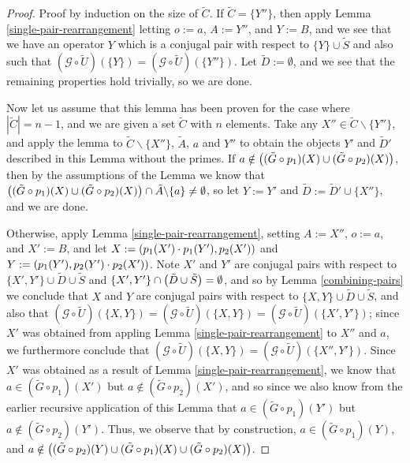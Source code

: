 \documentclass[twocolumn,showpacs,preprintnumbers,amsmath,amssymb,nofootinbib,pra,floatfix]{revtex4-1}
\newcommand{\set}{\tilde}
\newcommand{\genfun}{\mathcal{G}}
\begin{document}
\begin{proof}
Proof by induction on the size of $\set C$.  If $\set C=\{Y''\}$, then apply Lemma \ref{single-pair-rearrangement} letting $o:=a$, $A:=Y''$, and $Y:=B$, and we see that we have an operator $Y$ which is a conjugal pair with respect to $\{Y\}\cup\set S$ and also such that $(\genfun\circ\set U)(\{Y\})=(\genfun\circ\set U)(\{Y''\})$.  Let $\set D:=\emptyset$, and we see that the remaining properties hold trivially, so we are done.

Now let us assume that this lemma has been proven for the case where $|\set C|=n-1$, and we are given a set $\set C$ with $n$ elements.  Take any $X''\in\set C\backslash\{Y''\}$, and apply the lemma to $\set C\backslash \{X''\}$, $\set A$, $a$ and $Y''$ to obtain the objects $Y'$ and $\set D'$ described in this Lemma without the primes.  If $a\notin\paren{(\set G\circ p_1)(X) \cup (\set G\circ p_2)(X)}$, then by the assumptions of the Lemma we know that $\paren{(\set G\circ p_1)(X) \cup (\set G\circ p_2)(X)} \cap \set A\backslash \{a\} \ne \emptyset$, so let $Y:=Y'$ and $\set D:=\set D'\cup\{X''\}$, and we are done.

Otherwise, apply Lemma \ref{single-pair-rearrangement}, setting $A:=X''$, $o:=a$, and $X':=B$, and let $X:=\left(p_1(X')\cdot p_1(Y'),p_2(X')\right)$ and $Y:=\left(p_1(Y'),p_2(Y')\cdot p_2(X')\right)$.  Note $X'$ and $Y'$ are conjugal pairs with respect to $\{X',Y'\}\cup\set D\cup\set S$ and $\{X',Y'\}\cap \paren{\set D\cup\set S}=\emptyset$, and so by Lemma \ref{combining-pairs} we conclude that $X$ and $Y$ are conjugal pairs with respect to $\{X,Y\}\cup\set D\cup\set S$, and also that $(\genfun\circ\set U)(\{X,Y\})=(\genfun\circ\set U)(\{X,Y\})=(\genfun\circ\set U)(\{X',Y'\})$;  since $X'$ was obtained from appling Lemma \ref{single-pair-rearrangement} to $X''$ and $a$, we furthermore conclude that $(\genfun\circ\set U)(\{X,Y\})=(\genfun\circ\set U)(\{X'',Y'\})$.  Since $X'$ was obtained as a result of Lemma \ref{single-pair-rearrangement}, we know that $a\in (\set G \circ p_1)(X')$ but $a\notin (\set G \circ p_2)(X')$, and so since we also know from the earlier recursive application of this Lemma that $a\in (\set G \circ p_1)(Y')$ but $a\notin (\set G \circ p_2)(Y')$.  Thus, we observe that by construction, $a\in (\set G \circ p_1)(Y)$, and $a\notin \paren{(\set G \circ p_2)(Y) \cup (\set G \circ p_1)(X) \cup (\set G \circ p_2)(X)}$.


\end{proof}
\end{document}
